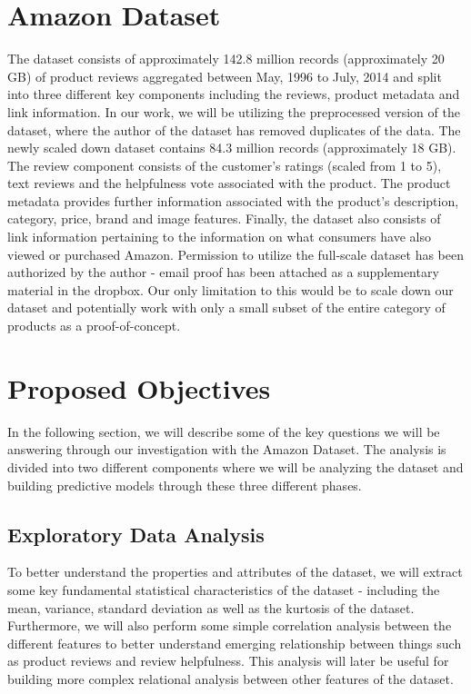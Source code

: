 \documentclass[a4paper, 11pt]{article}
\begin{document}
\section*{Amazon Dataset}
The dataset consists of approximately 142.8 million records (approximately 20 GB) of product reviews aggregated between May, 1996 to July, 2014 and split into three different key components including the reviews, product metadata and link information. In our work, we will be utilizing the preprocessed version of the dataset, where the author of the dataset has removed duplicates of the data. The newly scaled down dataset contains 84.3 million records (approximately 18 GB). The review component consists of the customer's ratings (scaled from 1 to 5), text reviews and the helpfulness vote associated with the product. The product metadata provides further information associated with the product's description, category, price, brand and image features. Finally, the dataset also consists of link information pertaining to the information on what consumers have also viewed or purchased Amazon. Permission to utilize the full-scale dataset has been authorized by the author - email proof has been attached as a supplementary material in the dropbox. Our only limitation to this would be to scale down our dataset and potentially work with only a small subset of the entire category of products as a proof-of-concept.

\section*{Proposed Objectives}
In the following section, we will describe some of the key questions we will be answering through our investigation with the Amazon Dataset. The analysis is divided into two different components where we will be analyzing the dataset and building predictive models through these three different phases.

\subsection{Exploratory Data Analysis}
To better understand the properties and attributes of the dataset, we will extract some key fundamental statistical characteristics of the dataset - including the mean, variance, standard deviation as well as the kurtosis of the dataset. Furthermore, we will also perform some simple correlation analysis between the different features to better understand emerging relationship between things such as product reviews and review helpfulness. This analysis will later be useful for building more complex relational analysis between other features of the dataset.
\end{document}
